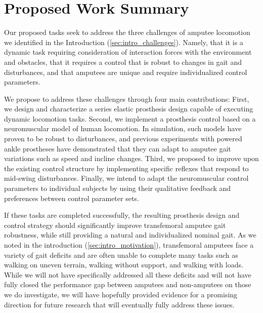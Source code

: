 \section{Proposed Work Summary}\label{sec:proposed_summary}

Our proposed tasks seek to address the three challenges of amputee locomotion we
identified in the Introduction (\cref{sec:intro_challenges}). Namely, that it is
a dynamic task requiring consideration of interaction forces with the
environment and obstacles, that it requires a control that is robust to changes
in gait and disturbances, and that amputees are unique and require
individualized control parameters. 

We propose to address these challenges through four main contributions: First,
we design and characterize a series elastic prosthesis design capable of
executing dynamic locomotion tasks. Second, we implement a prosthesis control
based on a neuromuscular model of human locomotion. In simulation, such models
have proven to be robust to disturbances, and previous experiments with powered
ankle prostheses have demonstrated that they can adapt to amputee gait
variations such as speed and incline changes.  Third, we proposed to improve
upon the existing control structure by implementing specific reflexes that
respond to mid-swing disturbances. Finally, we intend to adapt the neuromuscular
control parameters to individual subjects by using their qualitative feedback
and preferences between control parameter sets.

If these tasks are completed successfully, the resulting prosthesis design and
control strategy should significantly improve transfemoral amputee gait
robustness, while still providing a natural and individualized nominal gait. As
we noted in the introduction (\cref{sec:intro_motivation}), transfemoral
amputees face a variety of gait deficits and are often unable to complete many
tasks such as walking on uneven terrain, walking without support, and walking
with loads. While we will not have specifically addressed all these deficits and
will not have fully closed the performance gap between amputees and non-amputees
on those we do investigate, we will have hopefully provided evidence for a
promising direction for future research that will eventually fully address these
issues. 
